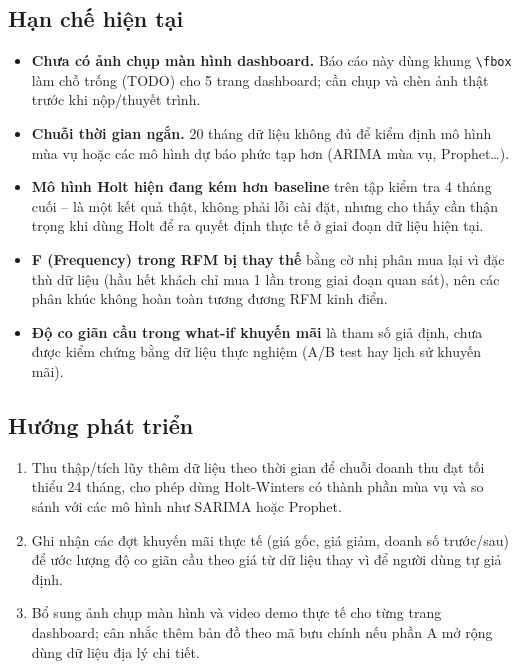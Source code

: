 \documentclass[12pt,a4paper]{article}
\newcommand{\code}[1]{\texttt{\small #1}}
\begin{document}
\subsection{Hạn chế hiện tại}
\begin{itemize}[nosep]
  \item \textbf{Chưa có ảnh chụp màn hình dashboard.} Báo cáo này dùng khung \code{\textbackslash fbox} làm chỗ
        trống (TODO) cho 5 trang dashboard; cần chụp và chèn ảnh thật trước khi nộp/thuyết trình.
  \item \textbf{Chuỗi thời gian ngắn.} 20 tháng dữ liệu không đủ để kiểm định mô hình mùa vụ hoặc các mô hình
        dự báo phức tạp hơn (ARIMA mùa vụ, Prophet\ldots).
  \item \textbf{Mô hình Holt hiện đang kém hơn baseline} trên tập kiểm tra 4 tháng cuối -- là một kết quả thật,
        không phải lỗi cài đặt, nhưng cho thấy cần thận trọng khi dùng Holt để ra quyết định thực tế ở giai
        đoạn dữ liệu hiện tại.
  \item \textbf{F (Frequency) trong RFM bị thay thế} bằng cờ nhị phân mua lại vì đặc thù dữ liệu (hầu hết khách
        chỉ mua 1 lần trong giai đoạn quan sát), nên các phân khúc không hoàn toàn tương đương RFM kinh điển.
  \item \textbf{Độ co giãn cầu trong what-if khuyến mãi} là tham số giả định, chưa được kiểm chứng bằng dữ liệu
        thực nghiệm (A/B test hay lịch sử khuyến mãi).
\end{itemize}

\subsection{Hướng phát triển}
\begin{enumerate}[nosep]
  \item Thu thập/tích lũy thêm dữ liệu theo thời gian để chuỗi doanh thu đạt tối thiểu 24 tháng, cho phép dùng
        Holt-Winters có thành phần mùa vụ và so sánh với các mô hình như SARIMA hoặc Prophet.
  \item Ghi nhận các đợt khuyến mãi thực tế (giá gốc, giá giảm, doanh số trước/sau) để ước lượng độ co giãn cầu
        theo giá từ dữ liệu thay vì để người dùng tự giả định.
  \item Bổ sung ảnh chụp màn hình và video demo thực tế cho từng trang dashboard; cân nhắc thêm bản đồ theo
        mã bưu chính nếu phần A mở rộng dùng dữ liệu địa lý chi tiết.
\end{enumerate}
\end{document}

